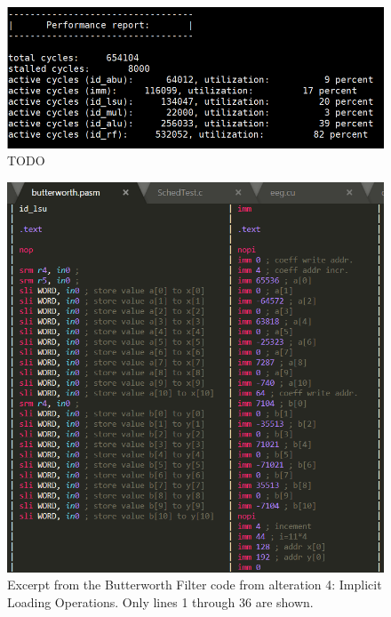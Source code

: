 \documentclass[letterpaper, 10 pt, conference]{ieeeconf}  %
\begin{document}
\begin{figure}[h]
\begin{center}
\includegraphics[scale=0.35]{images/O202.png}
\caption{TODO}
\label{fig:TODO}
\end{center}
\end{figure}




\begin{figure}[h]
\begin{center}
\includegraphics[scale=0.35]{images/assem01.png}
\caption{Excerpt from the Butterworth Filter code from alteration 4: Implicit Loading Operations. Only lines 1 through 36 are shown.}
\label{fig:TODO}
\end{center}
\end{figure}
\end{document}
